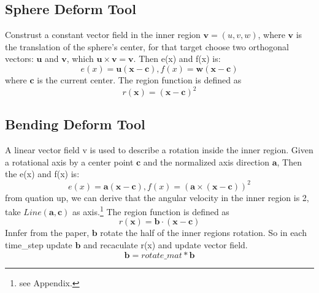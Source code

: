 \documentclass{article}
\theoremstyle{definition}
\theoremstyle{remark}
\begin{document}
\subsection{Sphere Deform Tool}
Construst a constant vector field in the inner region $\textbf{v}=(u, v, w)$, where $\textbf{v}$ is the translation of the sphere's center, for that target choose two orthogonal vectors: $\textbf{u}$ and $\textbf{v}$, which $\textbf{u} \times \textbf{v} = \textbf{v}$. Then e(x) and f(x) is:
\begin{equation}
  e(x)=\textbf{u}(\textbf{x}-\textbf{c}), f(x)=\textbf{w}(\textbf{x}-\textbf{c})
\end{equation}
where $\textbf{c}$ is the current center. The region function is defined as
\begin{equation}
  r(\textbf{x}) = (\textbf{x}-\textbf{c})^2
\end{equation}
\subsection{Bending Deform Tool}
A linear vector field v is used to describe a rotation inside the inner region. Given a rotational axis by a center point $\textbf{c}$ and the normalized axis direction $\textbf{a}$, Then the e(x) and f(x) is:
\begin{equation}
  e(x) = \textbf{a}(\textbf{x}-\textbf{c}), f(x)= (\textbf{a} \times (\textbf{x} - \textbf{c}))^2
\end{equation}
from quation up, we can derive that the angular velocity in the inner region is 2, take $Line(\textbf{a} , \textbf{c})$ as axis.\footnote{\noindent see Appendix.}
The region function is defined as
\begin{equation}
  r(\textbf{x}) = \textbf{b} \cdot (\textbf{x}-\textbf{c})
\end{equation}
Innfer from the paper, $\textbf{b}$ rotate the half of the inner regions rotation. So in each time\_step update $\textbf{b}$ and recaculate r(x) and update vector field.
\begin{equation}
  \textbf{b} = rotate\_mat * \textbf{b}
\end{equation}
\end{document}
